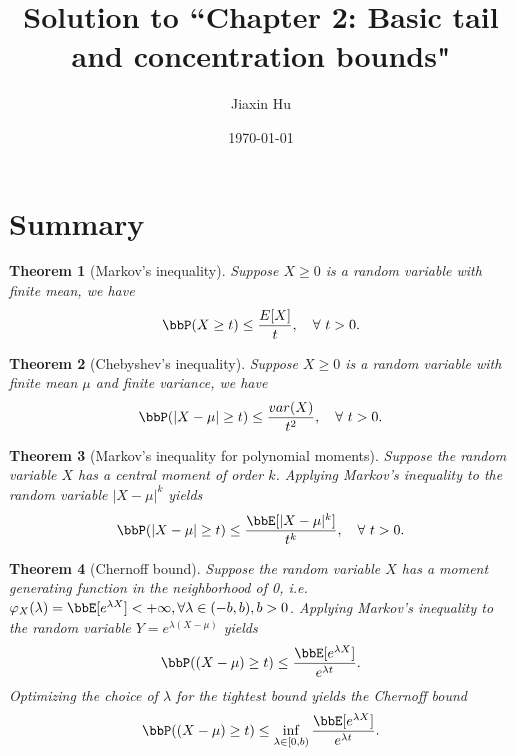 \documentclass[11pt]{article}
\title{Solution to ``Chapter 2: Basic tail and concentration bounds"}
\date{\today}
\author{%
Jiaxin Hu
}
\theoremstyle{plain}
\newtheorem{thm}{Theorem}[section]
\theoremstyle{definition}
\begin{document}

\maketitle

\section{Summary}
\begin{thm}[Markov's inequality]\label{thm:markov}
	Suppose $X \geq 0$ is a random variable  with finite mean, we have
	\begin{equation}
		\bbP(X\geq t) \leq \frac{E[X]}{t},\quad \forall \ t > 0.
	\end{equation}  
\end{thm}

\begin{thm}[Chebyshev's inequality]\label{thm:cheb}
	Suppose $X \geq 0$ is a random variable  with finite mean $\mu$ and finite variance, we have
	\begin{equation}
		\bbP(|X - \mu |\geq t) \leq \frac{var(X)}{t^2},\quad \forall \ t > 0.
	\end{equation}  
\end{thm}

\begin{thm}[Markov's inequality for polynomial moments]\label{thm:polymoment}
	Suppose the random variable $X$ has a central moment of order $k$. Applying Markov's inequality to the random variable $|X - \mu|^k$ yields
	\begin{equation}
		\bbP(|X - \mu |\geq t) \leq \frac{\bbE[|X-\mu|^k]}{t^k},\quad \forall \ t > 0.
	\end{equation}  
\end{thm}

\begin{thm}[Chernoff bound]\label{thm:chernoff}
	Suppose the random variable $X$ has a moment generating function in the neighborhood of 0, i.e.\ $\varphi_X(\lambda) = \bbE[e^{\lambda X}] < +\infty, \forall \lambda \in (-b,b), b>0$. Applying Markov's inequality to the random variable $Y = e^{\lambda(X- \mu)}$ yields
	\begin{equation}
		\bbP((X - \mu) \geq t) \leq \frac{\bbE[e^{\lambda X}]}{e^{\lambda t}}.
	\end{equation}
	Optimizing the choice of $\lambda$ for the tightest bound yields the Chernoff bound
	\begin{equation}
		\bbP((X - \mu) \geq t) \leq \inf_{\lambda \in [0,b)} \frac{\bbE[e^{\lambda X}]}{e^{\lambda t}}.
	\end{equation}
\end{thm}
\end{document}
